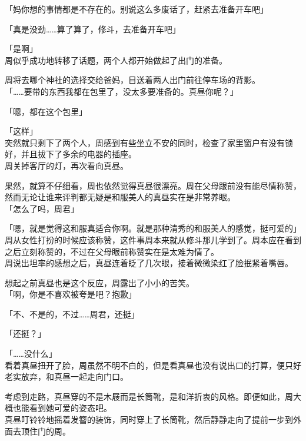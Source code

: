 「妈你想的事情都是不存在的。别说这么多废话了，赶紧去准备开车吧」

「真是没劲……算了算了，修斗，去准备开车吧」

「是啊」\\

周似乎成功地转移了话题，两个人都开始做起了出门的准备。

周将去哪个神社的选择交给爸妈，目送着两人出门前往停车场的背影。\\

「……要带的东西我都在包里了，没太多要准备的。真昼你呢？」

「嗯，都在这个包里」

「这样」\\

突然就只剩下了两个人，周感到有些坐立不安的同时，检查了家里窗户有没有锁好，并且拔下了多余的电器的插座。\\

周关掉客厅的灯，再次看向真昼。

果然，就算不仔细看，周也依然觉得真昼很漂亮。周在父母跟前没有能尽情称赞，然而无论让谁来评判都无疑是和服美人的真昼实在是非常养眼。\\

「怎么了吗，周君」

「嗯，就是觉得这和服真适合你啊。就是那种清秀的和服美人的感觉，挺可爱的」\\

周从女性打扮的时候应该称赞，这件事周本来就从修斗那儿学到了。周本应在看到之后立刻称赞的，不过在父母眼前称赞实在是太难为情了。\\

周说出坦率的感想之后，真昼连着眨了几次眼，接着微微染红了脸抿紧着嘴唇。

想起之前真昼也是这个反应，周露出了小小的苦笑。\\

「啊，你是不喜欢被夸是吧？抱歉」

「不、不是的，不过……周君，还挺」

「还挺？」

「……没什么」\\

看着真昼扭开了脸，周虽然不明不白的，但是看真昼也没有说出口的打算，便只好老实放弃，和真昼一起走向门口。

考虑到走路，真昼穿的不是木屐而是长筒靴，是和洋折衷的风格。即便如此，周大概也能看到她可爱的姿态吧。\\

真昼叮铃铃地摇着发簪的装饰，同时穿上了长筒靴，然后静静走向了提前一步到外面去顶住门的周。

